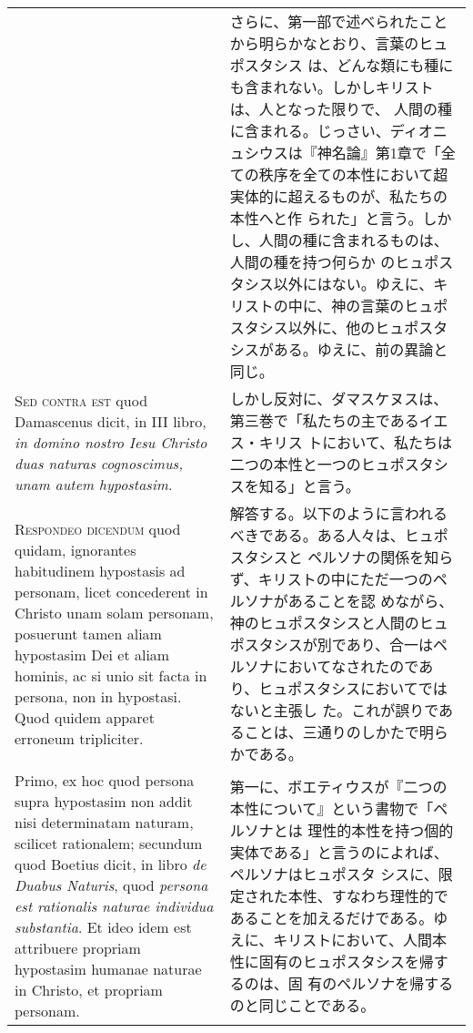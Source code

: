 \documentclass[10pt]{jsarticle} %
\begin{document}
\begin{longtable}{p{21em}p{21em}}
&

さらに、第一部で述べられたことから明らかなとおり、言葉のヒュポスタシス
は、どんな類にも種にも含まれない。しかしキリストは、人となった限りで、
人間の種に含まれる。じっさい、ディオニュシウスは『神名論』第1章で「全
ての秩序を全ての本性において超実体的に超えるものが、私たちの本性へと作
られた」と言う。しかし、人間の種に含まれるものは、人間の種を持つ何らか
のヒュポスタシス以外にはない。ゆえに、キリストの中に、神の言葉のヒュポ
スタシス以外に、他のヒュポスタシスがある。ゆえに、前の異論と同じ。

\\



{\scshape Sed contra est} quod Damascenus dicit, in III libro,
{\itshape in domino nostro Iesu Christo duas naturas cognoscimus, unam
autem hypostasim}.

&

しかし反対に、ダマスケヌスは、第三巻で「私たちの主であるイエス・キリス
トにおいて、私たちは二つの本性と一つのヒュポスタシスを知る」と言う。

\\



{\scshape Respondeo dicendum} quod quidam, ignorantes habitudinem
hypostasis ad personam, licet concederent in Christo unam solam
personam, posuerunt tamen aliam hypostasim Dei et aliam hominis, ac si
unio sit facta in persona, non in hypostasi. Quod quidem apparet
erroneum tripliciter.


&

解答する。以下のように言われるべきである。ある人々は、ヒュポスタシスと
ペルソナの関係を知らず、キリストの中にただ一つのペルソナがあることを認
めながら、神のヒュポスタシスと人間のヒュポスタシスが別であり、合一はペ
ルソナにおいてなされたのであり、ヒュポスタシスにおいてではないと主張し
た。これが誤りであることは、三通りのしかたで明らかである。


\\


Primo, ex hoc quod persona supra hypostasim non addit nisi
determinatam naturam, scilicet rationalem; secundum quod Boetius
dicit, in libro {\itshape de Duabus Naturis}, quod {\itshape persona
est rationalis naturae individua substantia}.  Et ideo idem est
attribuere propriam hypostasim humanae naturae in Christo, et propriam
personam.

&

第一に、ボエティウスが『二つの本性について』という書物で「ペルソナとは
理性的本性を持つ個的実体である」と言うのによれば、ペルソナはヒュポスタ
シスに、限定された本性、すなわち理性的であることを加えるだけである。ゆ
えに、キリストにおいて、人間本性に固有のヒュポスタシスを帰するのは、固
有のペルソナを帰するのと同じことである。



\end{longtable}
\end{document}
